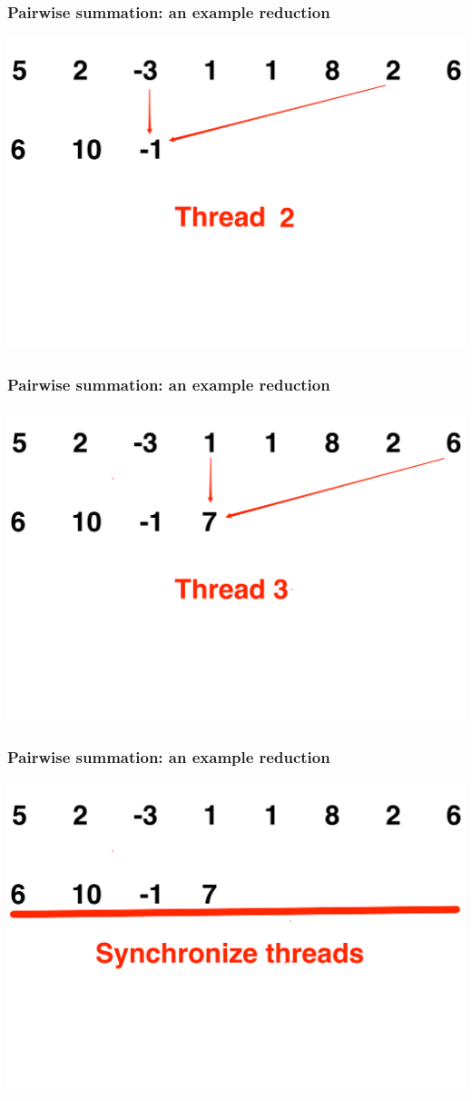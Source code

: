 \documentclass[handout]{beamer}
\numberwithin{equation}{section}
\begin{document}
\begin{frame}
\frametitle{Pairwise summation: an example reduction}
\includegraphics[scale=.15]{fig/psum3.pdf}
\end{frame}
{}
\begin{frame}
\frametitle{Pairwise summation: an example reduction}
\includegraphics[scale=.25]{fig/psum4.pdf}
\end{frame}

\begin{frame}
\frametitle{Pairwise summation: an example reduction}
\includegraphics[scale=.25]{fig/psum5.pdf}
\end{frame}
\end{document}
